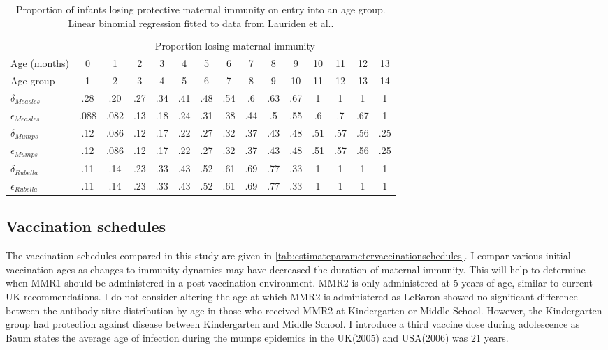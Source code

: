 \documentclass[a4paper,11pt] {scrartcl}
\begin{document}
\begin{table} [h]
\centering
\begin{tabular}{l c c c c c c c c c c c c c c}
\toprule
& \multicolumn{14}{c}{Proportion losing maternal immunity} \\
Age (months) & 0 & 1 & 2 & 3 & 4 & 5 & 6 & 7 & 8 & 9 & 10 & 11 & 12 & 13 \\
Age group& 1 & 2 & 3 & 4 & 5 & 6 & 7 & 8 & 9 & 10 & 11 & 12 & 13 & 14\\
\midrule
$\delta_{Measles}$ & .28 & .20 & .27 & .34 & .41 & .48 & .54 & .6 & .63 & .67 & 1 & 1 & 1 & 1\\
$\epsilon_{Measles}$ & .088 & .082 & .13 & .18 & .24 & .31 & .38 & .44 & .5 & .55 & .6 & .7 & .67 & 1\\
\midrule
$\delta_{Mumps}$& .12 & .086 & .12 & .17 & .22 & .27 & .32 & .37 & .43 & .48 & .51 & .57 & .56 & .25\\
$\epsilon_{Mumps}$& .12 & .086 & .12 & .17 & .22 & .27 & .32 & .37 & .43 & .48 & .51 & .57 & .56 & .25\\
\midrule
$\delta_{Rubella}$& .11 & .14 & .23 & .33 & .43 & .52 & .61 & .69 & .77 & .33 & 1 & 1 & 1 & 1\\
$\epsilon_{Rubella}$& .11 & .14 & .23 & .33 & .43 & .52 & .61 & .69 & .77 & .33 & 1 & 1 & 1 & 1\\
\bottomrule
\end{tabular}
\caption{Proportion of infants losing protective maternal immunity on entry into an age group. Linear binomial regression fitted to data from Lauriden et al.\cite{leuridan2010early,leuridan2011kinetics,leuridan2012maternal}.}
\label{tab:estimateparametersmaintainingmaternalimmunity}
\end{table}

\subsection{Vaccination schedules}
\label{subsec:estimateparametersvaccination}
The vaccination schedules compared in this study are given in \autoref{tab:estimateparametervaccinationschedules}. I compar various initial vaccination ages as changes to immunity dynamics may have decreased the duration of maternal immunity\cite{leuridan2010early}. This will help to determine when MMR1 should be administered in a post-vaccination environment. MMR2 is only administered at 5 years of age, similar to current UK recommendations. I do not consider altering the age at which MMR2 is administered as LeBaron\cite{lebaron2007measlespersistence,lebaron2009mumpspersistence} showed no significant difference between the antibody titre distribution by age in those who received MMR2 at Kindergarten or Middle School. However, the Kindergarten group had protection against disease between Kindergarten and Middle School. I introduce a third vaccine dose during adolescence as Baum\cite{baum2008cares} states the average age of infection during the mumps epidemics in the UK(2005) and USA(2006) was 21 years.
\end{document}

